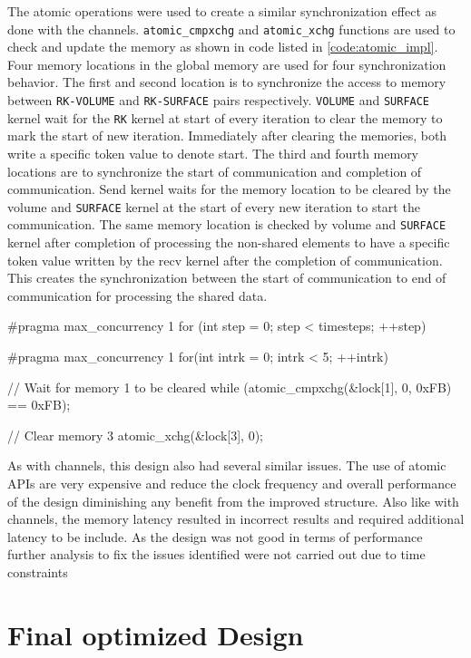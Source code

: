The atomic operations were used to create a similar synchronization effect as done with the channels.
\texttt{atomic\_cmpxchg} and \texttt{atomic\_xchg} functions are used to check and update the
memory as shown in code listed in \ref{code:atomic_impl}. Four memory locations in the global memory are used
for four synchronization behavior. The first and second location is to synchronize the access to  memory
between \texttt{RK-VOLUME} and \texttt{RK-SURFACE} pairs respectively. \texttt{VOLUME} and \texttt{SURFACE} kernel wait for the \texttt{RK} kernel
at start of every iteration to clear the memory to mark the start of new iteration. Immediately
after clearing the memories, both write a specific token value to denote start.
The third and fourth memory locations are to synchronize the start of communication and
completion of communication. Send kernel waits for the memory location to be cleared
by the volume and \texttt{SURFACE} kernel at the start of every new iteration to start the communication.
The same memory location is checked by volume and \texttt{SURFACE} kernel after completion of processing
the non-shared elements to have a specific token value written by the recv kernel after the completion
of communication. This creates the synchronization between the start of communication to end of communication
for processing the shared data.

\begin{CppCode}[caption=Synchronization Implementation with atomic functions, frame=tlrb, label=code:atomic_impl, float]
#pragma max_concurrency 1
for (int step = 0; step < timesteps; ++step)
{
    #pragma max_concurrency 1
    for(int intrk = 0; intrk < 5; ++intrk)
    {
        // Wait for memory 1 to be cleared
        while (atomic_cmpxchg(&lock[1], 0, 0xFB) == 0xFB);

        // Clear memory 3
        atomic_xchg(&lock[3], 0);
    }
}
\end{CppCode}

As with channels, this design also had several similar issues. The use of atomic APIs are very expensive and
reduce the clock frequency and overall performance of the design diminishing any benefit from the improved
structure. Also like with channels, the memory latency resulted in incorrect results and required additional
latency to be include. As the design was not good in terms of performance further analysis to fix the issues
identified were not carried out due to time constraints

\section{Final optimized Design}
\label{sec:final_struc}

